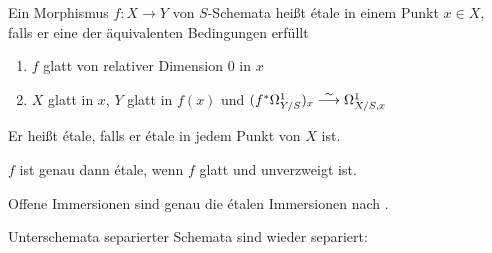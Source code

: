 \documentclass[german]{scrreprt}
\begin{document}
\begin{Definition}%
  Ein Morphismus $f\colon X\to Y$ von $S$-Schemata heißt étale in
  einem Punkt $x\in X$, falls er eine der äquivalenten Bedingungen
  erfüllt 
  \begin{enumerate}[label=(\roman*)]
  \item $f$ glatt von relativer Dimension 0 in $x$
  \item $X$ glatt in $x$, $Y$ glatt in $f(x)$ und 
    $(f^*\Omega_{Y/S}^1)_x \overset{\sim}{\longrightarrow} \Omega_{X/S,x}^1$
  \end{enumerate}
  Er heißt étale, falls er étale in jedem Punkt von $X$ ist.
  
  $f$ ist genau dann étale, wenn $f$ glatt und unverzweigt ist.

  Offene Immersionen sind genau die étalen Immersionen nach
  \cite[8.5, Lemma 7]{bosch}.
\end{Definition}

\begin{Definition}
  \cite[Theorem 15.8]{wedhorn}
  
  Unterschemata separierter Schemata sind wieder separiert:
  
\end{Definition}
\end{document}
